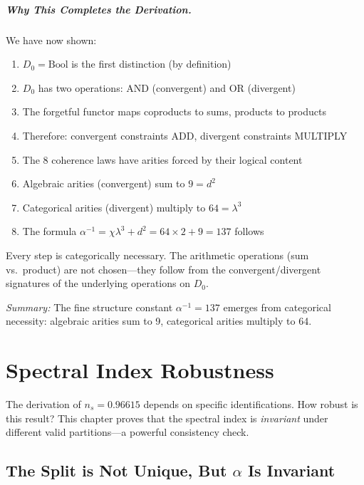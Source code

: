 \documentclass[11pt,a4paper]{book}
\begin{document}
\paragraph{Why This Completes the Derivation.}

We have now shown:

\begin{enumerate}
\item $D_0 = \text{Bool}$ is the first distinction (by definition)
\item $D_0$ has two operations: AND (convergent) and OR (divergent)
\item The forgetful functor maps coproducts to sums, products to products
\item Therefore: convergent constraints ADD, divergent constraints MULTIPLY
\item The 8 coherence laws have arities forced by their logical content
\item Algebraic arities (convergent) sum to $9 = d^2$
\item Categorical arities (divergent) multiply to $64 = \lambda^3$
\item The formula $\alpha^{-1} = \chi \lambda^3 + d^2 = 64 \times 2 + 9 = 137$ follows
\end{enumerate}

Every step is categorically necessary. The arithmetic operations (sum vs.\ product)
are not chosen---they follow from the convergent/divergent signatures of the 
underlying operations on $D_0$.

\medskip
\noindent\textit{Summary:} The fine structure constant $\alpha^{-1} = 137$ emerges from 
categorical necessity: algebraic arities sum to 9, categorical arities multiply to 64.

\chapter{Spectral Index Robustness}
\label{chap:spectral-index-robustness}

The derivation of $n_s = 0.96615$ depends on specific identifications. How robust is 
this result? This chapter proves that the spectral index is \emph{invariant} under 
different valid partitions—a powerful consistency check.

\section{The Split is Not Unique, But \texorpdfstring{$\alpha$}{α} Is Invariant}
\label{sec:alpha-robustness}
\end{document}
